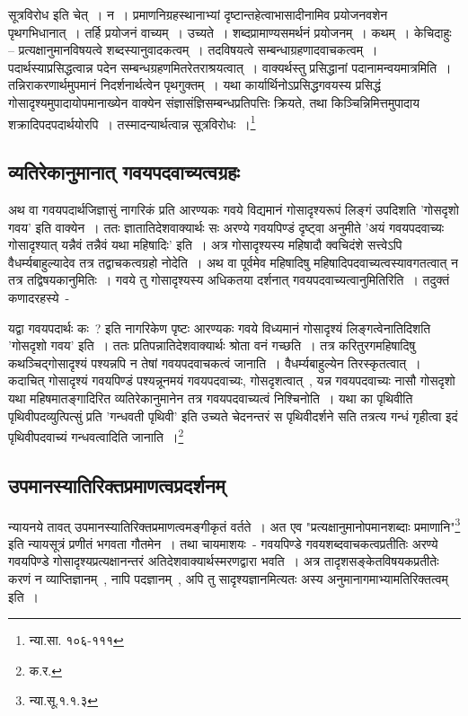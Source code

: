 		{\fontsize{11.7}{0}\selectfont\s सूत्रविरोध इति चेत्~। न~। प्रमाणनिग्रहस्थानाभ्यां दृष्टान्तहेत्वाभासादीनामिव प्रयोजनवशेन पृथगभिधानात्~। तर्हि प्रयोजनं वाच्यम्~। उच्यते~। शब्दप्रामाण्यसमर्थनं प्रयोजनम्~। कथम्~। केचिदाहुः – प्रत्यक्षानुमानविषयत्वे शब्दस्यानुवादकत्वम्~। तदविषयत्वे सम्बन्धाग्रहणादवाचकत्वम्~। पदार्थस्याप्रसिद्धत्वान्न पदेन सम्बन्धग्रहणमितरेतराश्रयत्वात्~। वाक्यर्थस्तु प्रसिद्धानां पदानामन्वयमात्रमिति~। तन्निराकरणार्थमुपमानं निदर्शनार्थत्वेन पृथगुक्तम्~। यथा कार्यार्थिनोऽप्रसिद्धगवयस्य प्रसिद्धं गोसादृश्यमुपादायोपमानाख्येन वाक्येन संज्ञासंज्ञिसम्बन्धप्रतिपत्तिः क्रियते, तथा किञ्चिन्निमित्तमुपादाय शक्रादिपदपदार्थयोरपि~। तस्मादन्यार्थत्वान्न सूत्रविरोधः~।\footnote{न्या.सा. १०६-१११}}

		\subsection{व्यतिरेकानुमानात् गवयपदवाच्यत्वग्रहः}

		अथ वा गवयपदार्थजिज्ञासुं नागरिकं प्रति आरण्यकः गवये विद्यमानं गोसादृश्यरूपं लिङ्गं उपदिशति 'गोसदृशो गवय' इति वाक्येन~। ततः ज्ञातातिदेशवाक्यार्थः सः अरण्ये गवयपिण्डं दृष्ट्वा अनुमीते 'अयं गवयपदवाच्यः गोसादृश्यात् यन्नैवं तन्नैवं यथा महिषादिः' इति~। अत्र गोसादृश्यस्य महिषादौ क्वचिदंशे सत्त्वेऽपि वैधर्म्यबाहुल्यादेव तत्र तद्वाचकत्वग्रहो नोदेति~। अथ वा पूर्वमेव महिषादिषु महिषादिपदवाच्यत्वस्यावगतत्वात् न तत्र तद्विषयकानुमितिः~। गवये तु गोसादृश्यस्य अधिकतया दर्शनात् गवयपदवाच्यत्वानुमितिरिति~। तदुक्तं कणादरहस्ये~-

		{\fontsize{11.7}{0}\selectfont\s यद्वा गवयपदार्थः कः~? इति नागरिकेण पृष्टः आरण्यकः गवये विध्यमानं गोसादृश्यं लिङ्गत्वेनातिदिशति 'गोसदृशो गवय' इति~। ततः प्रतिपन्नातिदेशवाक्यार्थः श्रोता वनं गच्छति~। तत्र करितुरगमहिषादिषु कथञ्चिद्गोसादृश्यं पश्यन्नपि न तेषां गवयपदवाचकत्वं जानाति~। वैधर्म्यबाहुल्येन तिरस्कृतत्वात्~। कदाचित् गोसादृश्यं गवयपिण्डं पश्यन्नूनमयं गवयपदवाच्यः, गोसदृशत्वात्~, यन्न गवयपदवाच्यः नासौ गोसदृशो यथा महिषमातङ्गादिरित व्यतिरेकानुमानेन तत्र गवयपदवाच्यत्वं निश्चिनोति~। यथा का पृथिवीति पृथिवीपदव्युत्पित्सुं प्रति 'गन्धवती पृथिवी' इति उच्यते चेदनन्तरं स पृथिवीदर्शने सति तत्रत्य गन्धं गृहीत्वा इदं पृथिवीपदवाच्यं गन्धवत्वादिति जानाति~।\footnote{क.र.}}


		\subsection{उपमानस्यातिरिक्तप्रमाणत्वप्रदर्शनम्}

		न्यायनये तावत् उपमानस्यातिरिक्तप्रमाणत्वमङ्गीकृतं वर्तते~। अत एव "प्रत्यक्षानुमानोपमानशब्दाः प्रमाणानि"\footnote{न्या.सू.१.१.३} इति न्यायसूत्रं प्रणीतं भगवता गौतमेन~। तथा चायमाशयः~- गवयपिण्डे गवयशब्दवाचकत्वप्रतीतिः अरण्ये गवयपिण्डे गोसादृश्यप्रत्यक्षानन्तरं अतिदेशवाक्यार्थस्मरणद्वारा भवति~। अत्र तादृशसङ्केतविषयकप्रतीतेः करणं न व्याप्तिज्ञानम्~, नापि पदज्ञानम्~, अपि तु सादृश्यज्ञानमित्यतः अस्य अनुमानागमाभ्यामतिरिक्तत्वम् इति~।

